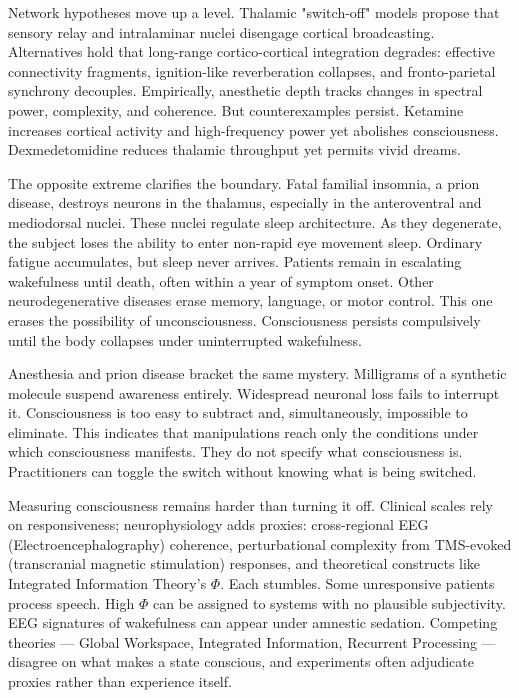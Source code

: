 Network hypotheses move up a level. Thalamic "switch-off" models propose that sensory relay and intralaminar nuclei disengage cortical broadcasting. Alternatives hold that long-range cortico-cortical integration degrades: effective connectivity fragments, ignition-like reverberation collapses, and fronto-parietal synchrony decouples. Empirically, anesthetic depth tracks changes in spectral power, complexity, and coherence. But counterexamples persist. Ketamine increases cortical activity and high-frequency power yet abolishes consciousness. Dexmedetomidine reduces thalamic throughput yet permits vivid dreams.

The opposite extreme clarifies the boundary. Fatal familial insomnia, a prion disease, destroys neurons in the thalamus, especially in the anteroventral and mediodorsal nuclei. These nuclei regulate sleep architecture. As they degenerate, the subject loses the ability to enter non-rapid eye movement sleep. Ordinary fatigue accumulates, but sleep never arrives. Patients remain in escalating wakefulness until death, often within a year of symptom onset. Other neurodegenerative diseases erase memory, language, or motor control. This one erases the possibility of unconsciousness. Consciousness persists compulsively until the body collapses under uninterrupted wakefulness.

Anesthesia and prion disease bracket the same mystery. Milligrams of a synthetic molecule suspend awareness entirely. Widespread neuronal loss fails to interrupt it. Consciousness is too easy to subtract and, simultaneously, impossible to eliminate. This indicates that manipulations reach only the conditions under which consciousness manifests. They do not specify what consciousness is. Practitioners can toggle the switch without knowing what is being switched.

Measuring consciousness remains harder than turning it off. Clinical scales rely on responsiveness; neurophysiology adds proxies: cross-regional EEG (Electroencephalography) coherence, perturbational complexity from TMS-evoked (transcranial magnetic stimulation) responses, and theoretical constructs like Integrated Information Theory's $\Phi$. Each stumbles. Some unresponsive patients process speech. High $\Phi$ can be assigned to systems with no plausible subjectivity. EEG signatures of wakefulness can appear under amnestic sedation. Competing theories — Global Workspace, Integrated Information, Recurrent Processing — disagree on what makes a state conscious, and experiments often adjudicate proxies rather than experience itself.

